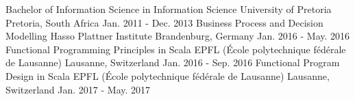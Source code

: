   \begin{cventries}
    \cventry
      {Bachelor of Information Science in Information Science} %
      {University of Pretoria} %
      {Pretoria, South Africa} %
      {Jan. 2011 - Dec. 2013} %
      {}
    \cventry
      {Business Process and Decision Modelling} %
      {Hasso Plattner Institute} %
      {Brandenburg, Germany} %
      {Jan. 2016 - May. 2016} %
      {}
    \cventry
      {Functional Programming Principles in Scala} %
      {EPFL (École polytechnique fédérale de Lausanne)} %
      {Lausanne, Switzerland} %
      {Jan. 2016 - Sep. 2016} %
      {}
    \cventry
      {Functional Program Design in Scala} %
      {EPFL (École polytechnique fédérale de Lausanne)} %
      {Lausanne, Switzerland} %
      {Jan. 2017 - May. 2017} %
      {}
  \end{cventries}
